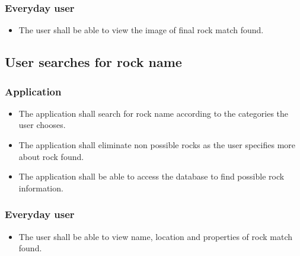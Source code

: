 \documentclass[titlepage]{article}
\begin{document}
  \subsubsection{Everyday user}
  \begin{itemize}
  \item The user shall be able to view the image of final rock match found.
\end{itemize}


\subsection{User searches for rock name}
\subsubsection{Application}
\begin{itemize}

  \item The application shall search for rock name according to the categories the user chooses.
  \item The application shall eliminate non possible rocks as the user specifies more about rock found. 
  \item The application shall be able to access the database to find possible rock information. 
  \end{itemize}
    \subsubsection{Everyday user}
  \begin{itemize}
  \item The user shall be able to view name, location and properties of rock match found. 
\end{itemize}
\end{document}
